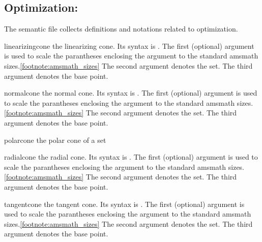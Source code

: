 \documentclass[english,a4paper,DIV=12,parskip=full,oneside]{scrartcl}
\begin{document}
\subsection{Optimization: \texorpdfstring{}{numapde-optimization.sty}}\label{subsec:optimization}

The semantic file  collects definitions and notations related to optimization.
\begin{commandlist}
	\item[linearizingcone] the linearizing cone.
		Its syntax is .
		The first (optional) argument is used to scale the parantheses enclosing the argument to the standard amsmath sizes.\cref{footnote:amsmath_sizes}
		The second argument denotes the set.
		The third argument denotes the base point.
		\par{}
		\par{}
		\par{}

	\item[normalcone] the normal cone.
		Its syntax is .
		The first (optional) argument is used to scale the parantheses enclosing the argument to the standard amsmath sizes.\cref{footnote:amsmath_sizes}
		The second argument denotes the set.
		The third argument denotes the base point.
		\par{}
		\par{}
		\par{}

	\item[polarcone] the polar cone of a set 

	\item[radialcone] the radial cone.
		Its syntax is .
		The first (optional) argument is used to scale the parantheses enclosing the argument to the standard amsmath sizes.\cref{footnote:amsmath_sizes}
		The second argument denotes the set.
		The third argument denotes the base point.
		\par{}
		\par{}
		\par{}

	\item[tangentcone] the tangent cone.
		Its syntax is .
		The first (optional) argument is used to scale the parantheses enclosing the argument to the standard amsmath sizes.\cref{footnote:amsmath_sizes}
		The second argument denotes the set.
		The third argument denotes the base point.
		\par{}
		\par{}
		\par{}
\end{commandlist}
\end{document}
